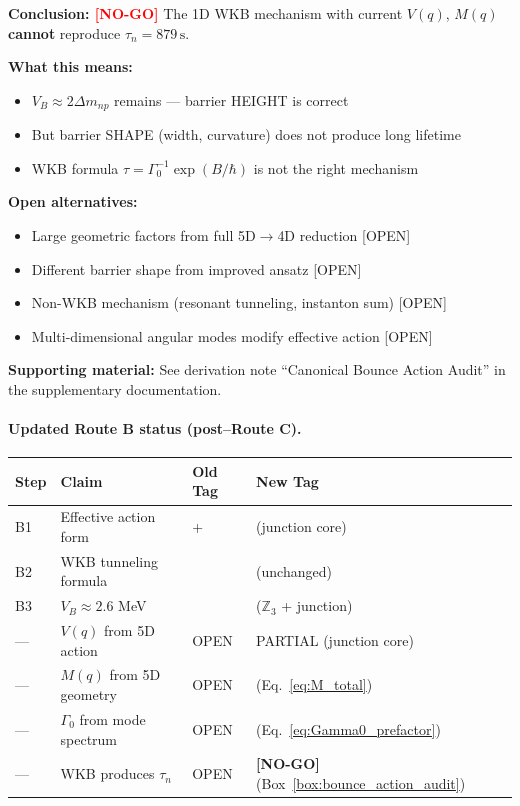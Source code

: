 \begin{tcolorbox}[colback=red!5!white, colframe=red!60!black,
                  title={\textbf{Canonical Bounce Action Audit: WKB NO-GO}}]
\textbf{Conclusion: \textcolor{red}{[NO-GO]}}
The 1D WKB mechanism with current $V(q)$, $M(q)$ \textbf{cannot} reproduce $\tau_n = 879\,\mathrm{s}$.

\textbf{What this means:}
\begin{itemize}[nosep]
  \item $V_B \approx 2\Delta m_{np}$ remains \tagDc{} --- barrier HEIGHT is correct
  \item But barrier SHAPE (width, curvature) does not produce long lifetime
  \item WKB formula $\tau = \Gamma_0^{-1}\exp(B/\hbar)$ is not the right mechanism
\end{itemize}

\textbf{Open alternatives:}
\begin{itemize}[nosep]
  \item Large geometric factors from full 5D$\to$4D reduction [OPEN]
  \item Different barrier shape from improved ansatz [OPEN]
  \item Non-WKB mechanism (resonant tunneling, instanton sum) [OPEN]
  \item Multi-dimensional angular modes modify effective action [OPEN]
\end{itemize}

\textbf{Supporting material:}
See derivation note ``Canonical Bounce Action Audit'' in the supplementary documentation.
\end{tcolorbox}

\paragraph{Updated Route B status (post--Route C).}

\begin{center}
\begin{tabular}{llll}
\toprule
\textbf{Step} & \textbf{Claim} & \textbf{Old Tag} & \textbf{New Tag} \\
\midrule
B1 & Effective action form & \tagP{}+\tagDc{} & \tagDc{} (junction core) \\
B2 & WKB tunneling formula & \tagM{} & \tagM{} (unchanged) \\
B3 & $V_B \approx 2.6$ MeV & \tagCal{} & \tagDc{} ($\mathbb{Z}_3$ + junction) \\
\midrule
--- & $V(q)$ from 5D action & OPEN & PARTIAL (junction core) \\
--- & $M(q)$ from 5D geometry & OPEN & \tagDc{} (Eq.~\ref{eq:M_total}) \\
--- & $\Gamma_0$ from mode spectrum & OPEN & \tagDc{} (Eq.~\ref{eq:Gamma0_prefactor}) \\
--- & WKB produces $\tau_n$ & OPEN & \textbf{[NO-GO]} (Box~\ref{box:bounce_action_audit}) \\
\bottomrule
\end{tabular}
\end{center}

